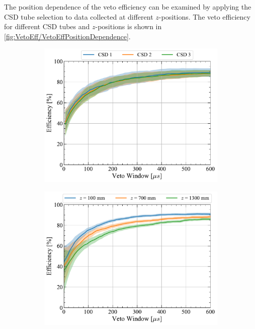 \begin{enumerate}
    The position dependence of the veto efficiency can be examined by applying the CSD tube selection to data collected at different $z$-positions. The veto efficiency for different CSD tubes and $z$-positions is shown in \autoref{fig:VetoEff/VetoEffPositionDependence}.
    
    \begin{figure}[!h]
    	\centering
    	\begin{subfigure}[b]{0.49\textwidth}
    		\centering
    		\includegraphics[width=\textwidth]{figures/VetoEfficiency/Eff_AmLi_Total_AllCSD.pdf}
    		\caption{}
            \label{fig:VetoEff/VetoEffPositionDependenceZPos}
    	\end{subfigure}
    	\hfill
    	\begin{subfigure}[b]{0.49\textwidth}
    		\centering
    		\includegraphics[width=\textwidth]{figures/VetoEfficiency/Eff_AmLi_Total_AllHeights.pdf}

\end{subfigure}
\end{figure}
\end{enumerate}
